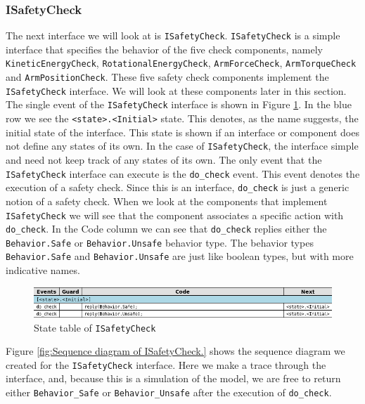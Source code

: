 \documentclass[12pt]{scrreprt}
\begin{document}
\subsubsection{ISafetyCheck}
The next interface we will look at is \texttt{ISafetyCheck}. \texttt{ISafetyCheck} is a simple interface that specifies the behavior of the five check components, namely \texttt{KineticEnergyCheck}, \texttt{RotationalEnergyCheck}, \texttt{ArmForceCheck}, \texttt{ArmTorqueCheck} and \texttt{ArmPositionCheck}. These five safety check components implement the \texttt{ISafetyCheck} interface. We will look at these components later in this section. The single event of the \texttt{ISafetyCheck} interface is shown in Figure \ref{fig:ISafetyCheck_state_table}. In the blue row we see the \texttt{<state>.<Initial>} state. This denotes, as the name suggests, the initial state of the interface. This state is shown if an interface or component does not define any states of its own. In the case of \texttt{ISafetyCheck}, the interface simple and need not keep track of any states of its own. The only event that the \texttt{ISafetyCheck} interface can execute is the \texttt{do\_check} event. This event denotes the execution of a safety check. Since this is an interface, \texttt{do\_check} is just a generic notion of a safety check. When we look at the components that implement \texttt{ISafetyCheck} we will see that the component associates a specific action with \texttt{do\_check}. In the Code column we can see that \texttt{do\_check} replies either the \texttt{Behavior.Safe} or \texttt{Behavior.Unsafe} behavior type. The behavior types \texttt{Behavior.Safe} and \texttt{Behavior.Unsafe} are just like boolean types, but with more indicative names.

\begin{figure}[H]
    \centering
    \includegraphics[width=\textwidth]{Figures/results/modelling_figures/ISafetyCheck/ISafetyCheck_state_table.png}
    \caption{State table of \texttt{ISafetyCheck}}
    \label{fig:ISafetyCheck_state_table}
\end{figure}

Figure \ref{fig:Sequence diagram of ISafetyCheck.} shows the sequence diagram we created for the \texttt{ISafetyCheck} interface. Here we make a trace through the interface, and, because this is a simulation of the model, we are free to return either \texttt{Behavior\_Safe} or \texttt{Behavior\_Unsafe} after the execution of \texttt{do\_check}.
\end{document}

